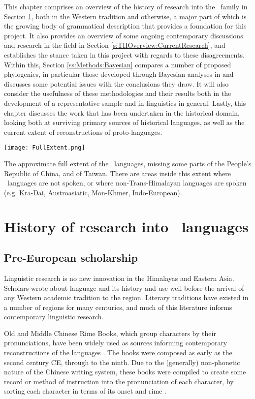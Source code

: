 This chapter comprises an overview of the history of research into the \lfam\ family in Section \ref{s:historyofresearch}, both in the Western tradition and otherwise, a major part of which is the growing body of grammatical description that provides a foundation for this project. It also provides an overview of some ongoing contemporary discussions and research in the field in Section \ref{s:THOverview:CurrentResearch}, and establishes the stance taken in this project with regards to these disagreements. Within this, Section \ref{ss:Methods:Bayesian} compares a number of proposed phylogenies, in particular those developed through Bayesian analyses in  and discusses some potential issues with the conclusions they draw. It will also consider the usefulness of these methodologies and their results both in the development of a representative sample and in linguistics in general. Lastly, this chapter discusses the work that has been undertaken in the historical domain, looking both at surviving primary sources of historical languages, as well as the current extent of reconstructions of proto-languages.

\begin{map}
\centering
\texttt{[image: FullExtent.png]}
\caption{The approximate full extent of the \lfam\ languages, missing some parts of the People's Republic of China, and of Taiwan. There are areas inside this extent where \lfam\ languages are not spoken, or where non-Trans-Himalayan languages are spoken (e.g. Kra-Dai, Austroasiatic, Mon-Khmer, Indo-European).}
\label{fig:OverallMap}
\end{map}


\section{History of research into \lfam\ languages}\label{s:historyofresearch}
\subsection{Pre-European scholarship}
Linguistic research is no new innovation in the Himalayas and Eastern Asia. Scholars wrote about language and its history and use well before the arrival of any Western academic tradition to the region. Literary traditions have existed in a number of regions for many centuries, and much of this literature informs contemporary linguistic research.

Old and Middle Chinese Rime Books, which group characters by their pronunciations, have been widely used as sources informing contemporary reconstructions of the languages \cite{Baxter1992}. The books were composed as early as the second century CE, through to the ninth. Due to the (generally) non-phonetic nature of the Chinese writing system, these books were compiled to create some record or method of instruction into the pronunciation of each character, by sorting each character in terms of its onset and rime \cite{Ji2021}.

